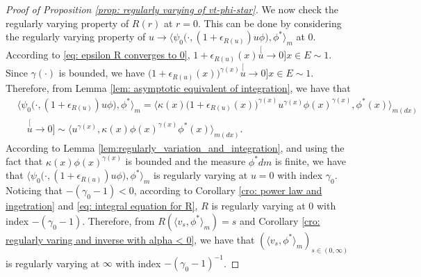 \documentclass[12pt, a4paper]{amsart}
\theoremstyle{definition}
\numberwithin{equation}{section}
\begin{document}
\begin{proof}[Proof of Proposition \ref{prop: regularly varying of vt-phi-star}]
	We now check the regularly varying property of $R(r)$ at $r=0$.
	This can be done by considering the regularly varying property of $u\to \big\langle \psi_0 \big(\cdot ,( 1 + \epsilon_{R(u)} ) u \phi \big), \phi^* \big\rangle_m$ at 0.
    According to \eqref{eq: epsilon R converges to 0},  $1+ \epsilon_{R(u)}(x) \stackrel[u\to 0]{x\in E}{\sim} 1$.
    Since $\gamma(\cdot)$ is bounded, we have $\big(1+ \epsilon_{R(u)}(x)\big)^{\gamma(x)}\stackrel[u\to 0]{x\in E}{\sim} 1$.
	Therefore, from Lemma \ref{lem: asymptotic equivalent of integration}, we have that
\begin{equation}\label{eq: regularly part in the integration}\begin{split}
	&\big\langle \psi_0 \big(\cdot,( 1 + \epsilon_{R(u)} ) u \phi \big), \phi^* \big\rangle_m
	= \big\langle \kappa (x)\big( 1 + \epsilon_{R(u)}(x)\big )^{\gamma(x)} u^{\gamma(x)} \phi(x)^{\gamma(x)} , \phi^*(x) \big\rangle_{m(dx)}
	\\ &\quad \stackrel[u\to 0]{}{\sim}  \langle u^{\gamma(x)} , \kappa (x)\phi(x)^{\gamma(x)} \phi^*(x) \rangle_{m(dx)}.
\end{split}\end{equation}
	According to Lemma \ref{lem:regularly_variation_and_integration}, 
	and using the fact that $\kappa(x)\phi(x)^{\gamma(x)}$ is bounded and the measure $\phi^* dm$ is finite, 
	we have that $\langle \psi_0\big(\cdot,(1+\epsilon_{R(u)})u\phi \big), \phi^* \rangle_m$ is regularly varying at $u = 0$ with index $\gamma_0$.
	Noticing that $-(\gamma_0 - 1) < 0$,
	according to Corollary \ref{cro: power law and ingetration} and \eqref{eq: integral equation for R}, $R$ is regularly varying at $0$ with index $-(\gamma_0 - 1)$.
	Therefore, from $R(\langle v_s, \phi^*\rangle_m) = s$ and Corollary \ref{cro: regularly varing and inverse with alpha < 0}, we have that $(\langle v_s, \phi^*\rangle_m)_{s\in (0,\infty)}$ is regularly varying at $\infty$ with index $-(\gamma_0 - 1)^{-1}$.
	

\end{proof}
\end{document}
